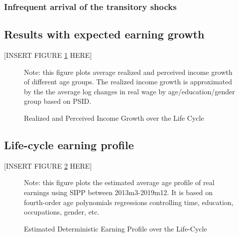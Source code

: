 \subsubsection{Infrequent arrival of the transitory shocks}

\subsection{Results with expected earning growth}


\begin{center}
[INSERT FIGURE \ref{fig:growth_age_compare} HERE] 
\end{center}


 \begin{figure}[!ht]
    	\caption{Realized and Perceived Income Growth over the Life Cycle}
    	\label{fig:growth_age_compare}
    	\begin{center}
    	\end{center}
    	\begin{flushleft} Note: this figure plots average realized and perceived income growth of different age groups. The realized income growth is approximated by the the average log changes in real wage by age/education/gender group based on PSID.\end{flushleft}
    \end{figure}
    

\subsection{Life-cycle earning profile}
\label{appendix:life-cycle-determinstic}

\begin{center}
[INSERT FIGURE \ref{fig:life-cycle-determinstic} HERE]  
\end{center}

 \begin{figure}[!ht]
    	\caption{Estimated Deterministic Earning Profile over the Life-Cycle}
    	\label{fig:life-cycle-determinstic}
    	\begin{center}
    	\end{center}
    	\begin{flushleft}Note:  this figure plots the estimated average age profile of real earnings using SIPP between 2013m3-2019m12. It is based on fourth-order age polynomials regressions controlling time, education, occupations, gender, etc.\end{flushleft}
    \end{figure}
    
